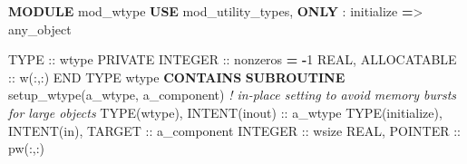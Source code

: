 \documentclass[]{scrartcl}
\newenvironment{Shaded}{}{}
\newcommand{\CommentTok}[1]{\textcolor[rgb]{0.38,0.63,0.69}{\textit{#1}}}
\newcommand{\DataTypeTok}[1]{\textcolor[rgb]{0.56,0.13,0.00}{#1}}
\newcommand{\DecValTok}[1]{\textcolor[rgb]{0.25,0.63,0.44}{#1}}
\newcommand{\KeywordTok}[1]{\textcolor[rgb]{0.00,0.44,0.13}{\textbf{#1}}}
\newcommand{\NormalTok}[1]{#1}
\newcommand{\OperatorTok}[1]{\textcolor[rgb]{0.40,0.40,0.40}{#1}}
\begin{document}
\begin{Shaded}
\begin{Highlighting}[]
\KeywordTok{MODULE}\NormalTok{ mod\_wtype}
   \KeywordTok{USE}\NormalTok{ mod\_utility\_types, }\KeywordTok{ONLY}\NormalTok{ : initialize }\KeywordTok{=}\OperatorTok{\textgreater{}}\NormalTok{ any\_object}

   \DataTypeTok{TYPE} \DataTypeTok{::}\NormalTok{ wtype}
      \DataTypeTok{PRIVATE}
      \DataTypeTok{INTEGER} \DataTypeTok{::}\NormalTok{ nonzeros }\KeywordTok{=} \KeywordTok{{-}}\DecValTok{1}
      \DataTypeTok{REAL}\NormalTok{, }\DataTypeTok{ALLOCATABLE} \DataTypeTok{::}\NormalTok{ w(:,:)}
   \DataTypeTok{END TYPE}\NormalTok{ wtype}
\KeywordTok{CONTAINS}
   \KeywordTok{SUBROUTINE}\NormalTok{ setup\_wtype(a\_wtype, a\_component)}
      \CommentTok{! in{-}place setting to avoid memory bursts for large objects}
      \DataTypeTok{TYPE(wtype)}\NormalTok{, }\DataTypeTok{INTENT(inout)} \DataTypeTok{::}\NormalTok{ a\_wtype}
      \DataTypeTok{TYPE(initialize)}\NormalTok{, }\DataTypeTok{INTENT(in)}\NormalTok{, }\DataTypeTok{TARGET} \DataTypeTok{::}\NormalTok{ a\_component}
      \DataTypeTok{INTEGER} \DataTypeTok{::}\NormalTok{ wsize}
      \DataTypeTok{REAL}\NormalTok{, }\DataTypeTok{POINTER} \DataTypeTok{::}\NormalTok{ pw(:,:)}


\end{Highlighting}
\end{Shaded}
\end{document}
